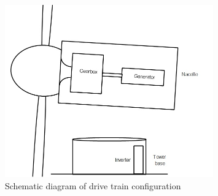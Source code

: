 \begin{figure}[H]
    \centering
    \includegraphics[width=0.8\textwidth]{Images/Drive_train_sketch.jpg}
    \caption{Schematic diagram of drive train configuration}
    \label{fig:eddie's art}
\end{figure}



